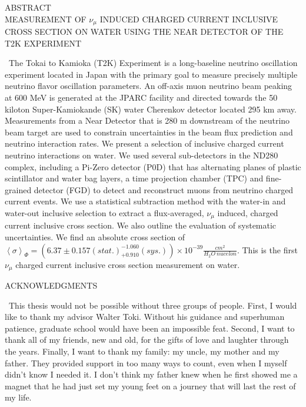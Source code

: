 \setcounter{page}{2}
\begin{center}
ABSTRACT\\
\bigskip
MEASUREMENT OF $\nu_\mu$ INDUCED CHARGED CURRENT INCLUSIVE CROSS SECTION ON WATER USING THE NEAR DETECTOR OF THE T2K EXPERIMENT\\
\end{center}
\medskip
\-\ \indent The Tokai to Kamioka (T2K) Experiment is a long-baseline neutrino oscillation experiment located in Japan with the primary goal to measure precisely multiple neutrino flavor oscillation parameters. An off-axis muon neutrino beam peaking at 600 MeV is generated at the JPARC facility and directed towards the 50 kiloton Super-Kamiokande (SK) water Cherenkov detector located 295 km away. Measurements from a Near Detector that is 280 m downstream of the neutrino beam target are used to constrain uncertainties in the beam flux prediction and neutrino interaction rates. We present a selection of inclusive charged current neutrino interactions on water. We used several sub-detectors in the ND280 complex, including a Pi-Zero detector (P0D) that has alternating planes of plastic scintillator and water bag layers, a time projection chamber (TPC) and fine-grained detector (FGD) to detect and reconstruct muons from neutrino charged current events. We use a statistical subtraction method with the water-in and water-out inclusive selection to extract a flux-averaged, $\nu_\mu$ induced, charged current inclusive cross section. We also outline the evaluation of systematic uncertainties. We find an absolute cross section of $\left<\sigma\right>_\Phi = (6.37 \pm 0.157 (stat.) ^{-1.060}_{+0.910} (sys.))\times 10^{-39} \frac{cm^2}{H_2O\:nucelon}$. This is the first $\nu_\mu$ charged current inclusive cross section measurement on water. 

\newpage
{}
\begin{center}
ACKNOWLEDGMENTS
\end{center}
\medskip
\-\ \indent This thesis would not be possible without three groups of people. First, I would like to thank my advisor Walter Toki. Without his guidance and superhuman patience, graduate school would have been an impossible feat. Second, I want to thank all of my friends, new and old, for the gifts of love and laughter through the years. Finally, I want to thank my family: my uncle, my mother and my father. They provided support in too many ways to count, even when I myself didn't know I needed it. I don't think my father knew when he first showed me a magnet that he had just set my young feet on a journey that will last the rest of my life.
\pagebreak




